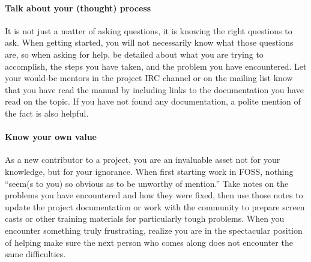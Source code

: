 \paragraph*{Talk about your (thought) process} It is not just a matter of asking questions, it is knowing the right questions to ask. When getting started, you will not necessarily know what those questions are, so when asking for help, be detailed about what you are trying to accomplish, the steps you have taken, and the problem you have encountered. Let your would-be mentors in the project IRC channel or on the mailing list know that you have read the manual by including links to the documentation you have read on the topic. If you have not found any documentation, a polite mention of the fact is also helpful.

\paragraph*{Know your own value} As a new contributor to a project, you are an invaluable asset not for your knowledge, but for your ignorance. When first starting work in FOSS, nothing ``seem(s to you) so obvious as to be unworthy of mention.'' Take notes on the problems you have encountered and how they were fixed, then use those notes to update the project documentation or work with the community to prepare screen casts or other training materials for particularly tough problems. When you encounter something truly frustrating, realize you are in the spectacular position of helping make sure the next person who comes along does not encounter the same difficulties.

